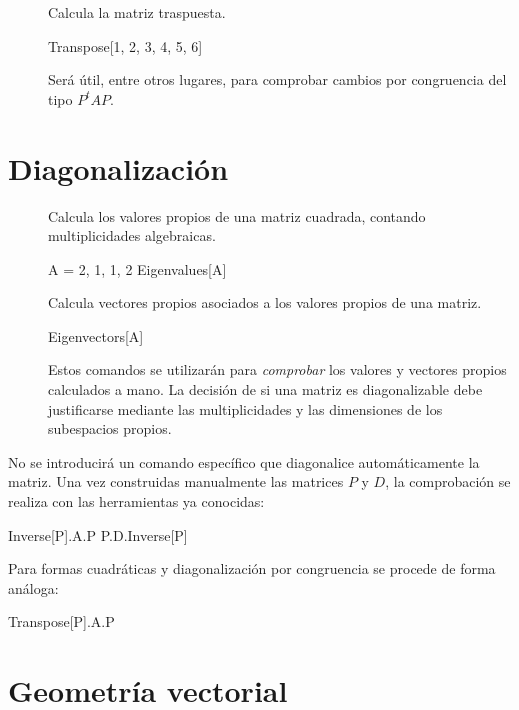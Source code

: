 \begin{description}
\item[] Calcula la matriz traspuesta.
\begin{mathematicacode}
Transpose[{{1, 2, 3}, {4, 5, 6}}]
\end{mathematicacode}
Será útil, entre otros lugares, para comprobar cambios por congruencia del tipo $P^t A P$.

\end{description}

\section*{Diagonalización}

\begin{description}

\item[] Calcula los valores propios de una matriz cuadrada, contando multiplicidades algebraicas.
\begin{mathematicacode}
A = {{2, 1}, {1, 2}}
Eigenvalues[A]
\end{mathematicacode}

\item[] Calcula vectores propios asociados a los valores propios de una matriz.
\begin{mathematicacode}
Eigenvectors[A]
\end{mathematicacode}
Estos comandos se utilizarán para \emph{comprobar} los valores y vectores propios calculados a mano. La decisión de si una matriz es diagonalizable debe justificarse mediante las multiplicidades y las dimensiones de los subespacios propios.

\end{description}

No se introducirá un comando específico que diagonalice automáticamente la matriz. Una vez construidas manualmente las matrices $P$ y $D$, la comprobación se realiza con las herramientas ya conocidas:
\begin{mathematicacode}
Inverse[P].A.P
P.D.Inverse[P]
\end{mathematicacode}
Para formas cuadráticas y diagonalización por congruencia se procede de forma análoga:
\begin{mathematicacode}
Transpose[P].A.P
\end{mathematicacode}

\section*{Geometría vectorial}

